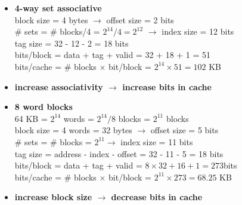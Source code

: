 \documentclass{../cheatsheet}
\begin{document}
\begin{multicols*}{2}
\begin{itemize}
        \item \textbf{4-way set associative}\\
            block size = 4 bytes $\rightarrow$ offset size = 2 bits\\
            \# sets = \# blocks/4 = $2^{14}/4 = 2^{12}$ $\rightarrow$ index size
            = 12 bits\\
            tag size = 32 - 12 - 2 = 18 bits\\
            bits/block = data + tag + valid = 32 + 18 + 1 = 51\\
            bits/cache = \# blocks $\times$ bit/block = $2^{14} \times 51 = 102$
            KB

        \item \textbf{increase associativity $\rightarrow$ increase bits in
            cache}

        \item \textbf{8 word blocks}\\
            64 KB = $2^{14}$ words = $2^{14}/8$ blocks = $2^{11}$ blocks\\
            block size = 4 words = 32 bytes $\rightarrow$ offset size = 5 bits\\
            \# sets = \# blocks = $2^{11} \rightarrow$ index size = 11 bits\\
            tag size = address - index - offset = 32 - 11 - 5 = 18 bits\\
            bits/block = data + tag + valid = $8 \times 32 + 16 + 1 = 273$bits\\
            bits/cache = \# blocks $\times$ bit/block = $2^{11} \times273=68.25$
            KB

        \item \textbf{increase block size $\rightarrow$ decrease bits in cache}
    \end{itemize}


\end{multicols*}
\end{document}
